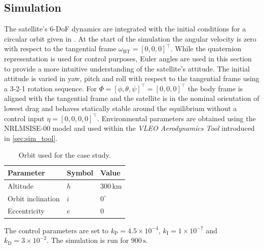 \documentclass[pdflatex,sn-mathphys-num]{sn-jnl}%
\theoremstyle{thmstyleone}%
\theoremstyle{thmstyletwo}%
\theoremstyle{thmstylethree}%
\begin{document}
	\subsection{Simulation}
	\label{sec:simulation}
	The satellite's 6-DoF dynamics are integrated with the initial conditions for a circular orbit given in . At the start of the simulation the angular velocity is zero with respect to the tangential frame $\omega_{\text{BT}}=[0,0,0]^{\top}$. While the quaternion representation is used for control purposes, Euler angles are used in this section to provide a more intuitive understanding of the satellite's attitude.
	The initial attitude is varied in yaw, pitch and roll with respect to the tangential frame using a 3-2-1 rotation sequence. For $\Phi=[\phi,\theta,\psi]^{\top}=[0,0,0]^{\top}$ the body frame is aligned with the tangential frame and the satellite is in the nominal orientation of lowest drag and behaves statically stable around the equilibrium without a control input $\eta=[0,0,0,0]^{\top}$.
	Environmental parameters are obtained using the NRLMSISE-00 model \cite{piconeNRLMSISE00EmpiricalModel2002} and used within the \textit{VLEO Aerodynamics Tool} introduced in \cref{sec:sim_tool}. 
	
	\begin{table}[ht]
		\centering
		\caption{Orbit used for the case study.}
		\begin{tabular}{l|l|l}
			\hline
			\textbf{Parameter} & \textbf{Symbol} & \textbf{Value} \\
			\hline
			Altitude & $h$ & $300\,\text{km}$ \\
			Orbit inclination & $i$ & $0^{\circ}$ \\
			Eccentricity & $e$ & $0$ \\
			\hline
		\end{tabular}
		\label{tab:initial_conditions}
	\end{table}

	The control parameters are set to $k_{\text{P}}=4.5 \times 10^{-4}$, $k_{\text{I}}=1\times 10^{-7}$ and $k_{\text{D}}=3\times 10^{-2}$. The simulation is run for $900\,\text{s}$.
\end{document}
